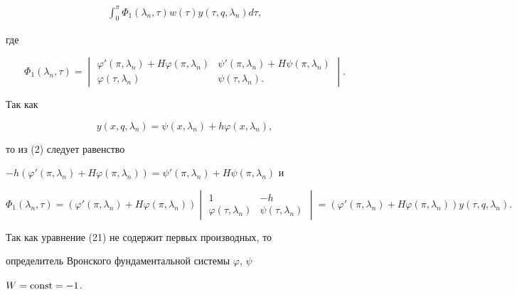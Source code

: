 \begin{pf}
\begin{multline}
\int^\pi_0 \Phi_1(\lambda_n,\tau)w(\tau)y(\tau,q,\lambda_n)d\tau, 


\end{multline} 


где 


$$ 


\Phi_1(\lambda_n,\tau)= 


\begin{vmatrix} 


\varphi'(\pi,\lambda_n)+H\varphi(\pi,\lambda_n) & 


\psi'(\pi,\lambda_n)+H\psi(\pi,\lambda_n) \\ 


\varphi(\tau,\lambda_n) & \psi(\tau,\lambda_n). 


\end{vmatrix} 


.


$$ 


Так как 


$$ 


y(x,q,\lambda_n)=\psi(x,\lambda_n)+ 


h\varphi(x,\lambda_n), 


$$ 


то из (2) следует равенство 


$-h(\varphi'(\pi,\lambda_n)+H\varphi(\pi,\lambda_n))= 


\psi'(\pi,\lambda_n)+H\psi(\pi,\lambda_n)$ и 


\begin{equation} 


\Phi_1(\lambda_n,\tau){=}(\varphi'(\pi,\lambda_n){+}


H\varphi(\pi,\lambda_n)) 


\begin{vmatrix} 


1 & -h \\ \varphi(\tau,\lambda_n) & \psi(\tau,\lambda_n) 


\end{vmatrix} 


{=}(\varphi'(\pi,\lambda_n){+}H\varphi(\pi,\lambda_n)) 


y(\tau,q,\lambda_n). 


\end{equation} 


Так как уравнение (21) не содержит первых производных, то 


определитель Вронского фундаментальной системы $\varphi$, $\psi$\, 


$W=\operatorname{const}=-1$. 



\end{pf}

